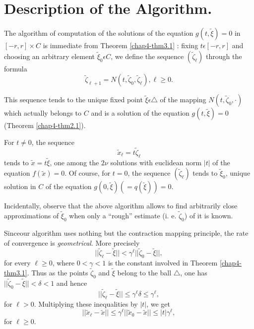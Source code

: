 \section{Description of the Algorithm.}\label{chap4-sec4}

The algorithm of computation of the solutions of the equation $g(t,
\widetilde{\xi}) = 0$ in $[-r, r] \times C$ is immediate from Theorem
\ref{chap4-thm3.1} : fixing $t \epsilon [-r, r]$ and choosing an
arbitrary element $\widetilde{\xi}_{0} \epsilon C$, we define the
sequence $(\widetilde{\zeta}_{\ell})$ through the formula
\begin{equation*}
\widetilde{\zeta}_{\ell + 1} = N(t, \widetilde{\zeta}_{0},
\widetilde{\zeta}_{\ell}), \ell \geq 0.\tag{4.1}\label{chap4-eq4.1}
\end{equation*}

This sequence tends to the unique fixed point $\widetilde{\xi}
\epsilon \triangle$ of the mapping $N(t, \widetilde{\zeta}_{0},
\cdot)$ which actually belongs to $C$ and is a solution of the equation
$g(t, \widetilde{\xi}) = 0$ (Theorem \ref{chap4-thm2.1}).

For $t \neq 0$, the sequence
$$
\widetilde{x}_{\ell} = t\widetilde{\zeta}_{\ell}
$$
tends to $\widetilde{x} = t\widetilde{\xi}$, one among the $2\nu$
solutions with euclidean norm $|t|$ of the equation $f(\widetilde{x}) =
0$. Of course, for $t = 0$, the sequence $(\widetilde{\zeta}_{\ell})$
tends to $\widetilde{\xi}_{0}$, unique solution in $C$ of the equation
$g(0, \widetilde{\xi})(= q(\widetilde{\xi})) = 0$.

\begin{remark}\label{chap4-rem4.1}
Incidentally, observe that the above algorithm allows to find
arbitrarily close approximations of $\widetilde{\xi}_{0}$ when only a
``rough'' estimate (i. e. $\widetilde{\zeta}_{0}$) of it is known.
\end{remark}

Since\pageoriginale our algorithm uses nothing but the contraction
mapping principle, the rate of convergence is {\em geometrical}. More precisely
$$
||\widetilde{\zeta}_{\ell} - \widetilde{\xi}|| < \gamma^{\ell}
||\widetilde{\zeta}_{0} - \widetilde{\xi}||,
$$
for every $\ell \geq 0$, where $0 < \gamma < 1$ is the constant
involved in Theorem \ref{chap4-thm3.1}. Thus as the points
$\widetilde{\zeta}_{0}$ and $\widetilde{\xi}$ belong to the ball
$\triangle$, one has $||\widetilde{\zeta}_{0} - \widetilde{\xi}|| <
\delta < 1$ and hence
$$
||\widetilde{\zeta}_{\ell} - \widetilde{\xi}|| \leq \gamma^{\ell}
\delta \leq \gamma^{\ell},
$$
for $\ell > 0$. Multiplying these inequalities by $|t|$, we get
\begin{equation*}
||\widetilde{x}_{\ell} - \widetilde{x}|| \leq \gamma^{\ell}
||\widetilde{x}_{0} - \widetilde{x}|| \leq |t| \gamma^{\ell},\tag{4.2}\label{chap4-eq4.2}
\end{equation*}
for $\ell \geq 0$.

